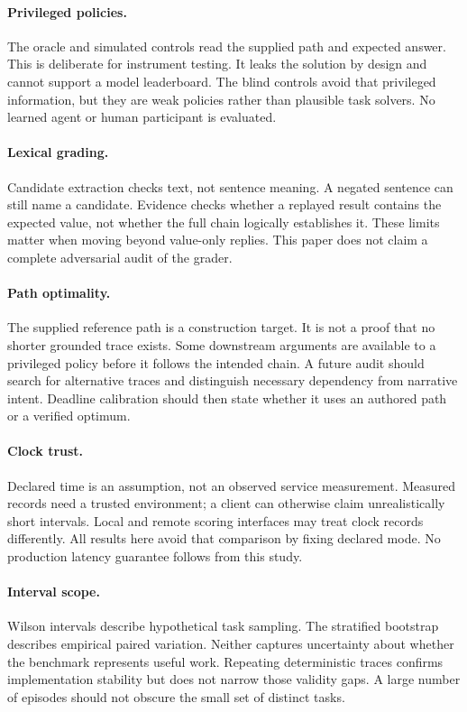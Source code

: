 \documentclass{article}
\begin{document}
\paragraph{Privileged policies.} The oracle and simulated controls read the supplied path and expected answer. This is deliberate for instrument testing. It leaks the solution by design and cannot support a model leaderboard. The blind controls avoid that privileged information, but they are weak policies rather than plausible task solvers. No learned agent or human participant is evaluated.\par
\paragraph{Lexical grading.} Candidate extraction checks text, not sentence meaning. A negated sentence can still name a candidate. Evidence checks whether a replayed result contains the expected value, not whether the full chain logically establishes it. These limits matter when moving beyond value-only replies. This paper does not claim a complete adversarial audit of the grader.\par
\paragraph{Path optimality.} The supplied reference path is a construction target. It is not a proof that no shorter grounded trace exists. Some downstream arguments are available to a privileged policy before it follows the intended chain. A future audit should search for alternative traces and distinguish necessary dependency from narrative intent. Deadline calibration should then state whether it uses an authored path or a verified optimum.\par
\paragraph{Clock trust.} Declared time is an assumption, not an observed service measurement. Measured records need a trusted environment; a client can otherwise claim unrealistically short intervals. Local and remote scoring interfaces may treat clock records differently. All results here avoid that comparison by fixing declared mode. No production latency guarantee follows from this study.\par
\paragraph{Interval scope.} Wilson intervals describe hypothetical task sampling. The stratified bootstrap describes empirical paired variation. Neither captures uncertainty about whether the benchmark represents useful work. Repeating deterministic traces confirms implementation stability but does not narrow those validity gaps. A large number of episodes should not obscure the small set of distinct tasks.\par
\end{document}
